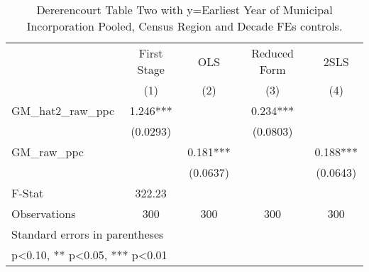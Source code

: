\begin{table}[htbp]\centering
\def\sym#1{\ifmmode^{#1}\else\(^{#1}\)\fi}
\caption{Dererencourt Table Two with y=Earliest Year of Municipal Incorporation  Pooled, Census Region and Decade FEs controls.}
\begin{tabular}{l*{4}{c}}
\toprule
                    & First Stage   &         OLS   &Reduced Form   &        2SLS   \\
                    &\multicolumn{1}{c}{(1)}   &\multicolumn{1}{c}{(2)}   &\multicolumn{1}{c}{(3)}   &\multicolumn{1}{c}{(4)}   \\
\midrule
GM\_hat2\_raw\_ppc     &       1.246***&               &       0.234***&               \\
                    &    (0.0293)   &               &    (0.0803)   &               \\
\addlinespace
GM\_raw\_ppc          &               &       0.181***&               &       0.188***\\
                    &               &    (0.0637)   &               &    (0.0643)   \\
\midrule
F-Stat              &      322.23   &               &               &               \\
Observations        &         300   &         300   &         300   &         300   \\
\bottomrule
\multicolumn{5}{l}{\footnotesize Standard errors in parentheses}\\
\multicolumn{5}{l}{\footnotesize * p<0.10, ** p<0.05, *** p<0.01}\\
\end{tabular}
\end{table}
